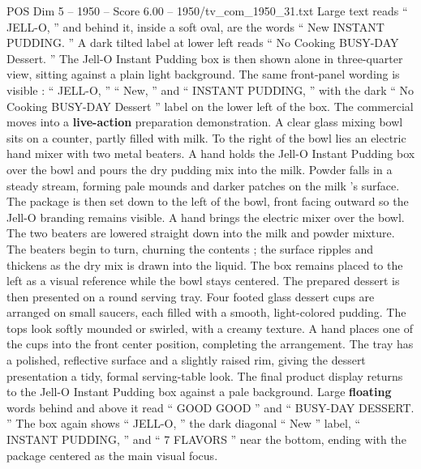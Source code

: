 \begin{textsample}{POS Dim 5 – 1950 – Score 6.00 – 1950/tv\_com\_1950\_31.txt}
Large text reads “ JELL-O, ” and behind it, inside a soft oval, are the words “ New INSTANT PUDDING. ” A dark tilted label at lower left reads “ No Cooking BUSY-DAY Dessert. ” The Jell-O Instant Pudding box is then shown alone in three-quarter view, sitting against a plain light background.
The same front-panel wording is visible : “ JELL-O, ” “ New, ” and “ INSTANT PUDDING, ” with the dark “ No Cooking BUSY-DAY Dessert ” label on the lower left of the box.
The commercial moves into a \textbf{live-action} preparation demonstration.
A clear glass mixing bowl sits on a counter, partly filled with milk.
To the right of the bowl lies an electric hand mixer with two metal beaters.
A hand holds the Jell-O Instant Pudding box over the bowl and pours the dry pudding mix into the milk.
Powder falls in a steady stream, forming pale mounds and darker patches on the milk ’s surface.
The package is then set down to the left of the bowl, front facing outward so the Jell-O branding remains visible.
A hand brings the electric mixer over the bowl.
The two beaters are lowered straight down into the milk and powder mixture.
The beaters begin to turn, churning the contents ; the surface ripples and thickens as the dry mix is drawn into the liquid.
The box remains placed to the left as a visual reference while the bowl stays centered.
The prepared dessert is then presented on a round serving tray.
Four footed glass dessert cups are arranged on small saucers, each filled with a smooth, light-colored pudding.
The tops look softly mounded or swirled, with a creamy texture.
A hand places one of the cups into the front center position, completing the arrangement.
The tray has a polished, reflective surface and a slightly raised rim, giving the dessert presentation a tidy, formal serving-table look.
The final product display returns to the Jell-O Instant Pudding box against a pale background.
Large \textbf{floating} words behind and above it read “ GOOD GOOD ” and “ BUSY-DAY DESSERT. ” The box again shows “ JELL-O, ” the dark diagonal “ New ” label, “ INSTANT PUDDING, ” and “ 7 FLAVORS ” near the bottom, ending with the package centered as the main visual focus.

\end{textsample}
